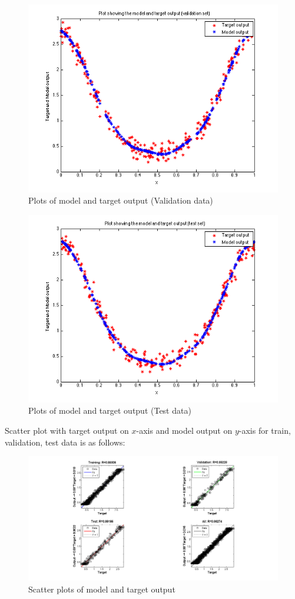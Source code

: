 \documentclass{article}
\begin{document}
\begin{figure}[H]
\centering
\includegraphics[width=0.5\linewidth]{Regression/univariate/valOutput.png}
\caption{Plots of model and target output (Validation data)}
\end{figure}

\begin{figure}[H]
\centering
\includegraphics[width=0.5\linewidth]{Regression/univariate/testOutput.png}
\caption{Plots of model and target output (Test data)}
\end{figure}

Scatter plot with target output on $x$-axis and model output on $y$-axis for train, validation, test data is as follows:

\begin{figure}[H]
\centering
\includegraphics[width=1.2\linewidth]{Regression/univariate/Scatter_plots.png}
\caption{Scatter plots of model and target output}
\end{figure}
\end{document}

